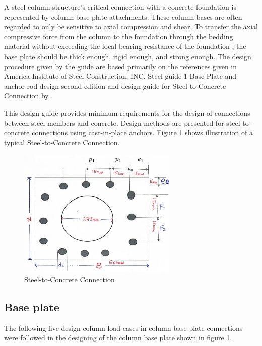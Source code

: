 {A steel column structure's critical connection with a concrete foundation is represented by column base plate attachments. These column bases are often regarded to only be sensitive to axial compression and shear. To transfer the axial compressive force from the column to the foundation through the bedding material without exceeding the local bearing resistance of the foundation \cite{DesignofColumnBasePlates2010,punmia1998comprehensive}, the base plate should be thick enough, rigid enough, and strong enough.  The design procedure given by the guide are based primarily on the references given in America Institute of Steel Construction, INC. Steel guide 1 Base Plate and anchor rod design second edition \cite{fisher2006base} and design guide for Steel-to-Concrete Connection by \cite{cook1989design}. 



This design guide provides minimum requirements for the design of connections between steel members and concrete. Design methods are presented for steel-to-concrete connections using cast-in-place anchors.
Figure \ref{fig:3.13} shows illustration of a typical Steel-to-Concrete Connection.


\begin{figure}[htp]
    \centering
    \includegraphics[width=3in]{Figures/base plate design.jpg}
    \caption{Steel-to-Concrete Connection}
    \label{fig:3.13}
\end{figure}



\subsection{ Base plate }

The following five design column load cases in column base plate connections were  followed in the designing of the  column base plate shown in figure \ref{fig:3.13}. 

}
